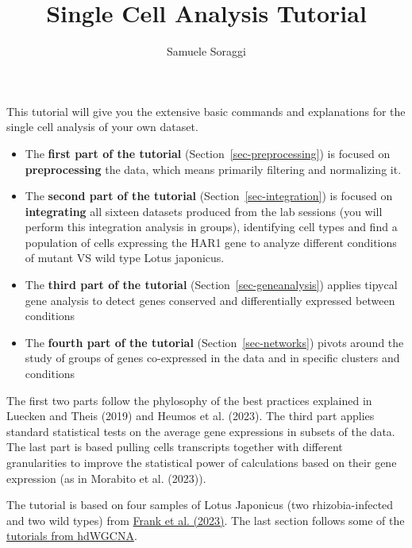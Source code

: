 \documentclass[
  letterpaper,
  DIV=11,
  numbers=noendperiod]{scrartcl}
\title{Single Cell Analysis Tutorial}
\author{Samuele Soraggi}
\date{}
\renewcommand*\contentsname{Table of contents}
\newcommand\contentsname{Table of contents}
\begin{document}
\maketitle

\renewcommand*\contentsname{Table of contents}
{
\hypersetup{linkcolor=}
\setcounter{tocdepth}{3}
\tableofcontents
}
This tutorial will give you the extensive basic commands and
explanations for the single cell analysis of your own dataset.

\begin{itemize}
\item
  The \textbf{first part of the tutorial}
  (Section~\ref{sec-preprocessing}) is focused on \textbf{preprocessing}
  the data, which means primarily filtering and normalizing it.
\item
  The \textbf{second part of the tutorial}
  (Section~\ref{sec-integration}) is focused on \textbf{integrating} all
  sixteen datasets produced from the lab sessions (you will perform this
  integration analysis in groups), identifying cell types and find a
  population of cells expressing the HAR1 gene to analyze different
  conditions of mutant VS wild type Lotus japonicus.
\item
  The \textbf{third part of the tutorial}
  (Section~\ref{sec-geneanalysis}) applies tipycal gene analysis to
  detect genes conserved and differentially expressed between conditions
\item
  The \textbf{fourth part of the tutorial} (Section~\ref{sec-networks})
  pivots around the study of groups of genes co-expressed in the data
  and in specific clusters and conditions
\end{itemize}

The first two parts follow the phylosophy of the best practices
explained in Luecken and Theis (2019) and Heumos et al. (2023). The
third part applies standard statistical tests on the average gene
expressions in subsets of the data. The last part is based pulling cells
transcripts together with different granularities to improve the
statistical power of calculations based on their gene expression (as in
Morabito et al. (2023)).

The tutorial is based on four samples of Lotus Japonicus (two
rhizobia-infected and two wild types) from
\href{https://www.ncbi.nlm.nih.gov/pmc/articles/PMC10630511/pdf/41467_2023_Article_42911.pdf}{Frank
et al. (2023)}. The last section follows some of the
\href{https://smorabit.github.io/hdWGCNA/}{tutorials from hdWGCNA}.
\end{document}
